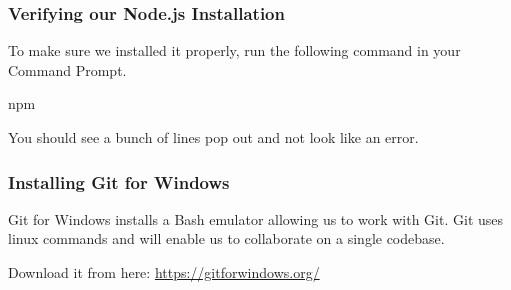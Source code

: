 \documentclass{beamer}
\begin{document}
  \begin{frame}[fragile]
    \frametitle{Verifying our Node.js Installation}

    To make sure we installed it properly, run the following command in your Command Prompt.
    \newline
    \begin{bashcode}
npm
    \end{bashcode}
    \vspace{0.5cm}
    You should see a bunch of lines pop out and not look like an error.

  \end{frame}

  \begin{frame}[fragile]
    \frametitle{Installing Git for Windows}

    Git for Windows installs a Bash emulator allowing us to work with Git. 
    Git uses linux commands and will enable us to collaborate on a single codebase.
    \newline

    Download it from here:  \url{https://gitforwindows.org/}

  \end{frame}
\end{document}
